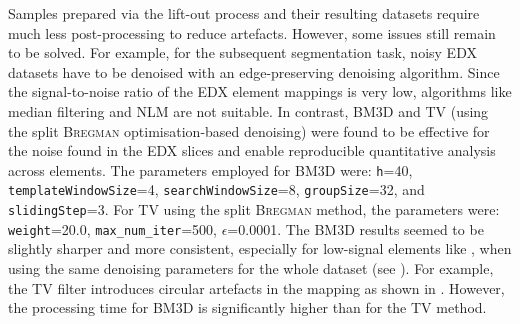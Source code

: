 Samples prepared via the lift-out process and their resulting datasets require much less post-processing to reduce artefacts.
However, some issues still remain to be solved.
For example, for the subsequent segmentation task, noisy \ac{EDX} datasets have to be denoised with an edge-preserving denoising algorithm.
Since the signal-to-noise ratio of the \ac{EDX} element mappings is very low, algorithms like median filtering and \ac{NLM} are not suitable.
In contrast, \ac{BM3D} and \ac{TV} (using the split \textsc{Bregman} optimisation-based denoising) were found to be effective for the noise found in the \ac{EDX} slices and enable reproducible quantitative analysis across elements.
The parameters employed for \ac{BM3D} were: \texttt{h}=\num{40}, \texttt{templateWindowSize}=\num{4}, \texttt{searchWindowSize}=\num{8}, \texttt{groupSize}=\num{32}, and \texttt{slidingStep}=\num{3}.
For \ac{TV} using the split \textsc{Bregman} method, the parameters were: \texttt{weight}=\num{20.0}, \texttt{max\_num\_iter}=\num{500}, $\epsilon$=\num{0.0001}.
The \ac{BM3D} results seemed to be slightly sharper and more consistent, especially for low-signal elements like , when using the same denoising parameters for the whole dataset (see ).
For example, the \ac{TV} filter introduces circular artefacts in the  mapping as shown in .
However, the processing time for \ac{BM3D} is significantly higher than for the \ac{TV} method.

